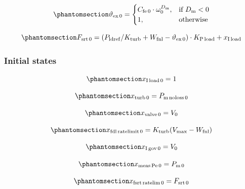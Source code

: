 \documentclass[
  a4paper,
  DIV=11,
  numbers=noendperiod]{scrartcl}
\begin{document}
\begin{equation}\phantomsection\label{eq-initTex}{
\vartheta_\mathrm{ex\,0} = 
\begin{cases}
    C_\mathrm{fe\,0} \cdot \omega_\mathrm{0}^{D_\mathrm{m}},& \text{if } D_\mathrm{m}<0\\
    1,              & \text{otherwise}
\end{cases}
}\end{equation}

\begin{equation}\phantomsection\label{eq-initFsrt}{
F_\mathrm{srt\,0} = (P_\mathrm{ldref}/K_\mathrm{turb} + W_\mathrm{fnl} - \vartheta_\mathrm{ex\,0}) \cdot K_\mathrm{P\,load} + x_\mathrm{I\,load}
}\end{equation}

\subsubsection{Initial states}\label{initial-states}

\begin{equation}\phantomsection\label{eq-initXiload}{
x_\mathrm{I\,load\,0} = 1
}\end{equation}

\begin{equation}\phantomsection\label{eq-initXTurbine}{
x_\mathrm{turb\,0} = P_\mathrm{m\,noloss\,0}
}\end{equation}

\begin{equation}\phantomsection\label{eq-initXValve}{
x_\mathrm{valve\,0} = V_\mathrm{0}
}\end{equation}

\begin{equation}\phantomsection\label{eq-initXFdl}{
x_\mathrm{fdl\,ratelimit\,0} = K_\mathrm{turb}(V_\mathrm{max}-W_\mathrm{fnl})
}\end{equation}

\begin{equation}\phantomsection\label{eq-initXIGov}{
x_\mathrm{I\,gov\,0} = V_\mathrm{0}
}\end{equation}

\begin{equation}\phantomsection\label{eq-initXMeasPe}{
x_\mathrm{meas\,Pe\,0} = P_\mathrm{m\,0}
}\end{equation}

\begin{equation}\phantomsection\label{eq-initFsrt}{
x_\mathrm{fsrt\,ratelim\,0} = F_\mathrm{srt\,0}
}\end{equation}
\end{document}
